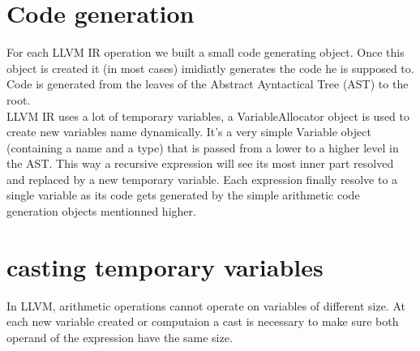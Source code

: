 \section{Code generation}
 
For each LLVM IR operation we built a small code generating object. Once this object is created it (in most cases) imidiatly generates the code he is supposed to.
Code is generated from the leaves of the Abstract Ayntactical Tree (AST) to the root.\\ LLVM IR uses a lot of temporary variables, a VariableAllocator object is used to create new variables name dynamically.
It's a very simple Variable object (containing a name and a type) that is passed from a lower to a higher level in the AST.
This way a recursive expression will see its most inner part resolved and replaced by a new temporary variable. Each expression finally resolve to a single variable as its code gets generated by the simple arithmetic code generation objects mentionned higher.


\section{casting temporary variables}

In LLVM, arithmetic operations cannot operate on variables of different size. At each new variable created or computaion a cast is necessary to make sure both operand of the expression have the same size.



